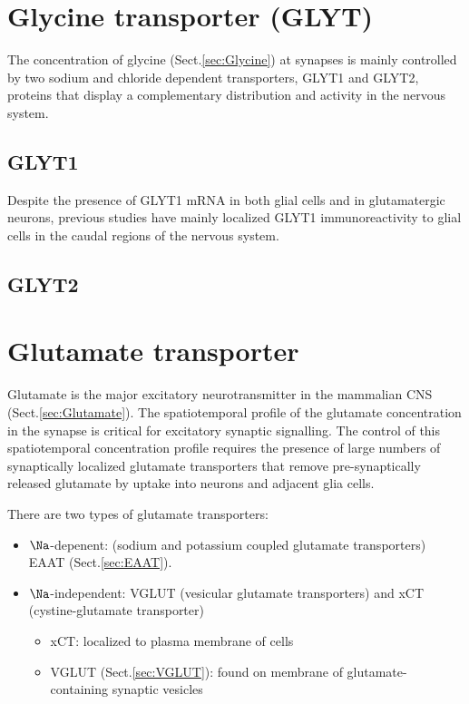 \section{Glycine transporter (GLYT)}
\label{sec:glycine-transporter}

The  concentration  of  glycine  (Sect.\ref{sec:Glycine}) at  synapses  is
mainly controlled by two sodium    and    chloride    dependent transporters,
GLYT1 and GLYT2, proteins   that   display   a   complementary   distribution
and  activity  in the  nervous  system.

\subsection{GLYT1}
\label{sec:GLYT1}

Despite the presence of GLYT1 mRNA in both glial cells and in glutamatergic
neurons, previous studies have mainly localized GLYT1 immunoreactivity to glial
cells in the caudal regions of the nervous system.

\subsection{GLYT2}
\label{sec:GLYT2}


\section{Glutamate transporter}
\label{sec:glutamate-transporter}

Glutamate is the major excitatory neurotransmitter in the mammalian CNS
(Sect.\ref{sec:Glutamate}). The spatiotemporal profile of the glutamate
concentration in the synapse is critical for excitatory synaptic signalling.
The control of this spatiotemporal concentration profile requires the presence
of large numbers of synaptically localized glutamate transporters that remove
pre-synaptically released glutamate by uptake into neurons and adjacent glia
cells.

There are two types of glutamate transporters: 
\begin{itemize}

  \item $\Na$-depenent: (sodium and potassium coupled glutamate transporters)
  EAAT (Sect.\ref{sec:EAAT}). 
  
    
  \item $\Na$-independent: VGLUT (vesicular glutamate transporters) and xCT
  (cystine-glutamate transporter)

  \begin{itemize}
    \item xCT: localized to plasma membrane of cells
    
    \item VGLUT (Sect.\ref{sec:VGLUT}): found on membrane of
    glutamate-containing synaptic vesicles
  \end{itemize}

\end{itemize}

